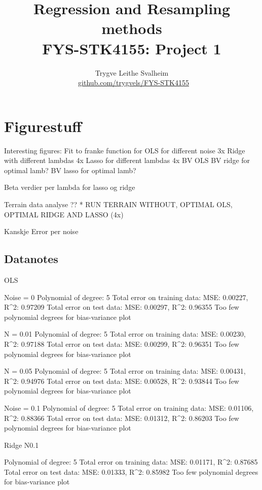 \documentclass[a4paper, twocolumn]{article}
\title{{\sc Regression and Resampling methods \\ {\large FYS-STK4155: Project 1}}}
\author{Trygve Leithe Svalheim \\ \faGithub \ {\small \href{https://github.com/trygvels/FYS-STK4155}{github.com/trygvels/FYS-STK4155}}}
\begin{document}
\twocolumn[
\begin{@twocolumnfalse}
\maketitle
\begin{abstract}
\end{abstract}

\tableofcontents 
\end{@twocolumnfalse}]
\clearpage



\iffalse
\section{Figurestuff}
Interesting figures:
Fit to franke function for OLS for different noise 3x
Ridge with different lambdas 4x
Lasso for different lambdas 4x
BV OLS
BV ridge for optimal lamb?
BV lasso for optimal lamb?

Beta verdier per lambda for lasso og ridge

Terrain data analyse ??
* RUN TERRAIN WITHOUT, OPTIMAL OLS, OPTIMAL RIDGE AND LASSO (4x)

Kanskje Error per noise

\subsection{Datanotes}

OLS

Noise = 0
Polynomial of degree:  5
Total error on training data:
MSE: 0.00227,  R^2: 0.97209
Total error on test data:
MSE: 0.00297,  R^2: 0.96355
Too few polynomial degrees for bias-variance plot

N = 0.01
Polynomial of degree:  5
Total error on training data:
MSE: 0.00230,  R^2: 0.97188
Total error on test data:
MSE: 0.00299,  R^2: 0.96351
Too few polynomial degrees for bias-variance plot

N = 0.05
Polynomial of degree:  5
Total error on training data:
MSE: 0.00431,  R^2: 0.94976
Total error on test data:
MSE: 0.00528,  R^2: 0.93844
Too few polynomial degrees for bias-variance plot


Noise = 0.1
Polynomial of degree:  5
Total error on training data:
MSE: 0.01106,  R^2: 0.88366
Total error on test data:
MSE: 0.01312,  R^2: 0.86203
Too few polynomial degrees for bias-variance plot

Ridge N0.1

Polynomial of degree:  5
Total error on training data:
MSE: 0.01171,  R^2: 0.87685
Total error on test data:
MSE: 0.01333,  R^2: 0.85982
Too few polynomial degrees for bias-variance plot
\end{document}
